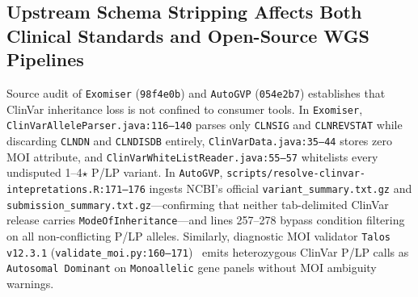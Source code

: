 \documentclass[11pt,letterpaper]{article}
\begin{document}
\subsection{Upstream Schema Stripping Affects Both Clinical Standards and Open-Source WGS Pipelines}
Source audit of \texttt{Exomiser} (\texttt{98f4e0b}) and \texttt{AutoGVP} (\texttt{054e2b7}) establishes that ClinVar inheritance loss is not confined to consumer tools. In \texttt{Exomiser}, \texttt{ClinVarAlleleParser.java:116--140} parses only \texttt{CLNSIG} and \texttt{CLNREVSTAT} while discarding \texttt{CLNDN} and \texttt{CLNDISDB} entirely, \texttt{ClinVarData.java:35--44} stores zero MOI attribute, and \texttt{ClinVarWhiteListReader.java:55--57} whitelists every undisputed 1--4$\star$ P/LP variant. In \texttt{AutoGVP}, \texttt{scripts/\allowbreak resolve-clinvar-intepretations.R:171--176} ingests NCBI's official \texttt{variant\_summary.txt.gz} and \texttt{submission\_summary.txt.gz}---confirming that neither tab-delimited ClinVar release carries \texttt{ModeOfInheritance}---and lines 257--278 bypass condition filtering on all non-conflicting P/LP alleles. Similarly, diagnostic MOI validator \texttt{Talos v12.3.1} (\texttt{validate\_moi.py:160--171})~\citep{welland2026talos} emits heterozygous ClinVar P/LP calls as \texttt{Autosomal Dominant} on \texttt{Monoallelic} gene panels without MOI ambiguity warnings.
\end{document}
